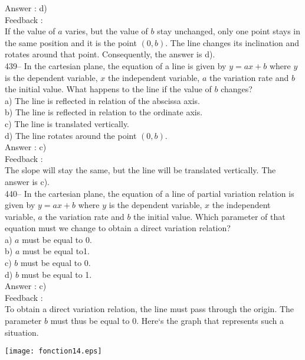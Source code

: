 \documentclass[letterpaper, 12pt]{article}
\begin{document}
Answer : d)\\

Feedback : \\
If the value of $a$ varies, but the value of $b$ stay unchanged, only one point stays in the same position and it is the point $(0,b)$.  The line changes its inclination and rotates around that point.  Consequently,
the answer is d).\\

439-- In the cartesian plane, the equation of a line is given by 
$y=ax+b$ where $y$ is the dependent variable, $x$ the independent variable, $a$ the variation rate and $b$ the initial value.
What happens to the line if the value of $b$ changes?\\
a) The line is reflected in relation of the abscissa axis.\\
b) The line is reflected in relation to the ordinate axis.\\
c) The line is translated vertically.\\
d) The line rotates around the point $(0,b)$.\\

Answer : c)\\

Feedback : \\
The slope will stay the same, but the line will be translated vertically.  The answer is c).\\

440-- In the cartesian plane, the equation of a line of partial variation relation is given by 
$y=ax+b$ where $y$ is the dependent variable, $x$ the independent variable, $a$ the variation rate and $b$ the initial value. Which parameter of that equation must we change to obtain a direct variation relation?\\
a) $a$ must be equal to 0.\\
b) $a$ must be equal to1.\\
c) $b$ must be equal to 0.\\
d) $b$ must be equal to 1.\\

Answer : c)\\

Feedback : \\
To obtain a direct variation relation, the line must pass through the origin. The parameter $b$ must thus be equal to 0.
Here`s the graph that represents such a situation.  \\
    \begin{center}
    \texttt{[image: fonction14.eps]}
    \end{center}
\end{document}
